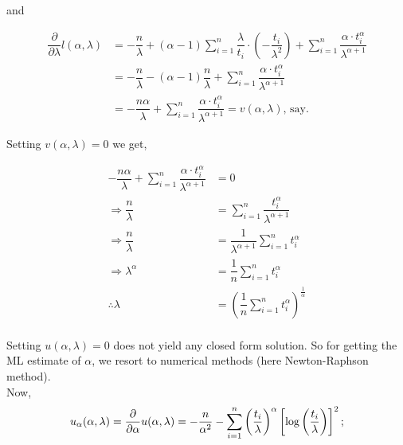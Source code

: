 \documentclass[11pt, a4paper]{article}\usepackage[]{graphicx}\usepackage[]{xcolor}
\begin{document}
\newpage

and

\begin{align*}
\dfrac{\partial}{\partial \lambda} l(\alpha, \lambda) &= -\dfrac{n}{\lambda} + (\alpha - 1) \sum \limits_{i=1}^{n} \dfrac{\lambda}{t_i} \cdot \left( -\dfrac{t_i}{\lambda^2} \right) + \sum \limits_{i=1}^{n} \dfrac{\alpha \cdot t_i^{\alpha}}{\lambda^{\alpha + 1}}\\[0.3cm]
&= -\dfrac{n}{\lambda} - (\alpha - 1) \dfrac{n}{\lambda} + \sum \limits_{i=1}^{n} \dfrac{\alpha \cdot t_i^{\alpha}}{\lambda^{\alpha + 1}}\\[0.3cm]
&= -\dfrac{n \alpha}{\lambda} + \sum \limits_{i=1}^{n} \dfrac{\alpha \cdot t_i^{\alpha}}{\lambda^{\alpha + 1}} = v(\alpha, \lambda) \text{, say}.
\end{align*}

Setting $v(\alpha, \lambda) = 0$ we get,


\begin{align*}
-\dfrac{n \alpha}{\lambda} + \sum \limits_{i=1}^{n} \dfrac{\alpha \cdot t_i^{\alpha}}{\lambda^{\alpha + 1}} &= 0 \nonumber \\
\Rightarrow \dfrac{n}{\lambda} &= \sum \limits_{i=1}^{n} \dfrac{t_i^{\alpha}}{\lambda^{\alpha + 1}} \nonumber \\
\Rightarrow \dfrac{n}{\lambda} &= \dfrac{1}{\lambda^{\alpha + 1}} \sum \limits_{i=1}^{n}{t_i^{\alpha}} \nonumber \\
\Rightarrow \lambda^{\alpha} &= \dfrac{1}{n} \sum \limits_{i=1}^{n}{t_i^{\alpha}} \nonumber \\
\therefore \lambda &= \left( \dfrac{1}{n} \sum \limits_{i=1}^{n}{t_i^{\alpha}} \right)^{\frac{1}{\alpha}} \tag{2} \\
\end{align*}

\setcounter{equation}{2}


Setting $u(\alpha, \lambda) = 0$ does not yield any closed form solution. So for getting the ML estimate of $\alpha$, we resort to numerical methods (here Newton-Raphson method). \\[1em]

Now, 
\begin{equation}
u_{\alpha}(\alpha, \lambda) = \dfrac{\partial}{\partial \alpha} u(\alpha, \lambda) = -\dfrac{n}{\alpha^2} - \sum \limits_{i=1}^{n} \left( \dfrac{t_i}{\lambda} \right)^{\alpha} \left[ \log \left( \dfrac{t_i}{\lambda} \right) \right]^2;\\[0.3cm]
\end{equation}
\end{document}
